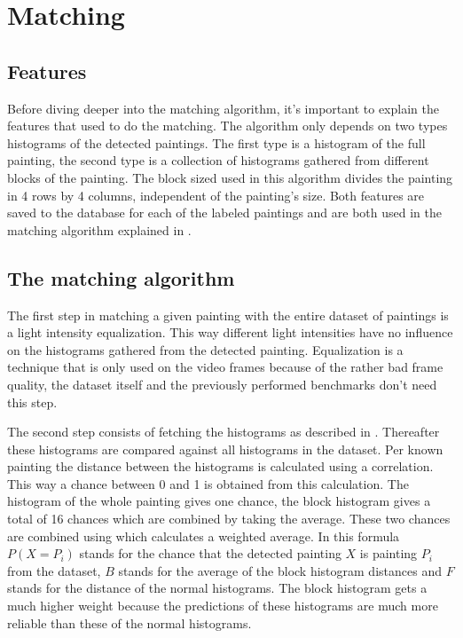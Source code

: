 \section{Matching}
\label{sec:matching}

\subsection{Features}
\label{subsec:the-features}

Before diving deeper into the matching algorithm, it's important to explain the features that used to do the matching. The algorithm only depends on two types histograms of the detected paintings. The first type is a histogram of the full painting, the second type is a collection of histograms gathered from different blocks of the painting. The block sized used in this algorithm divides the painting in 4 rows by 4 columns, independent of the painting's size. Both features are saved to the database for each of the labeled paintings and are both used in the matching algorithm explained in .

\subsection{The matching algorithm}
\label{subsec:matching-algo}

The first step in matching a given painting with the entire dataset of paintings is a light intensity equalization. This way different light intensities have no influence on the histograms gathered from the detected painting. Equalization is a technique that is only used on the video frames because of the rather bad frame quality, the dataset itself and the previously performed benchmarks don't need this step.


The second step consists of fetching the histograms as described in . Thereafter these histograms are compared against all histograms in the dataset. Per known painting the distance between the histograms is calculated using a correlation. This way a chance between 0 and 1 is obtained from this calculation. The histogram of the whole painting gives one chance, the block histogram gives a total of 16 chances which are combined by taking the average. These two chances are combined using  which calculates a weighted average. In this formula $P(X = P_{i})$ stands for the chance that the detected painting $X$ is painting $P_{i}$ from the dataset, $B$ stands for the average of the block histogram distances and $F$ stands for the distance of the normal histograms. The block histogram gets a much higher weight because the predictions of these histograms are much more reliable than these of the normal histograms.

